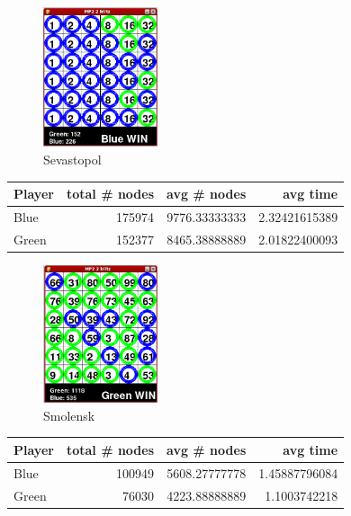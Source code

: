 \begin{multicols*}{2}
\begin{figure}[H]
\centering
\includegraphics[width=0.3\textwidth]{graphics/aa_sevastopol.png}
\caption{Sevastopol}
\end{figure}
\begin{tabular}{l|r|r|r}
  Player & total \# nodes & avg \# nodes & avg time \\
  \hline
  Blue & 175974 & 9776.33333333 & 2.32421615389 \\
  Green & 152377 & 8465.38888889 & 2.01822400093 \\
\end{tabular}

\begin{figure}[H]
\centering
\includegraphics[width=0.3\textwidth]{graphics/aa_smolensk.png}
\caption{Smolensk}
\end{figure}
\begin{tabular}{l|r|r|r}
  Player & total \# nodes & avg \# nodes & avg time \\
  \hline
  Blue & 100949 & 5608.27777778 & 1.45887796084 \\
  Green & 76030 & 4223.88888889 & 1.1003742218 \\
\end{tabular}


\end{multicols*}
